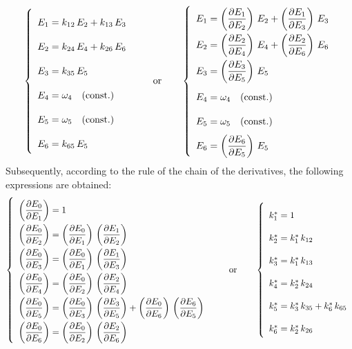 \documentclass[energies,article,submit,moreauthors,pdftex]{Definitions/mdpi}
\newcommand{\dpartial}[2]{\left(\dfrac{\partial E_{#1}}{\partial E_{#2}}\right)}
\begin{document}
\begin{equation}
    \def\arraystretch{2.1}
    \left\{\begin{array}{l}
        E_1=k_{12}\,E_2 + k_{13}\,E_3 \\
        E_2=k_{24}\,E_4 + k_{26}\,E_6 \\
        E_3=k_{35}\,E_5\\
        E_4=\omega_4 \quad \text{(const.)}\\
        E_5=\omega_5 \quad \text{(const.)}\\
        E_6=k_{65}\,E_5
    \end{array}\right.
    \qquad
    \text{or}
    \qquad
    \left\{\begin{array}{l}
        E_1=\dpartial{1}{2}\,E_2 + \dpartial{1}{3}\,E_3 \\
        E_2=\dpartial{2}{4}\,E_4 + \dpartial{2}{6}\,E_6 \\
        E_3=\dpartial{3}{5}\,E_5\\
        E_4=\omega_4 \quad \text{(const.)}\\
        E_5=\omega_5 \quad \text{(const.)}\\
        E_6=\dpartial{6}{5}\,E_5
    \end{array}\right.
    \label{eq:egenplant}
\end{equation}
Subsequently, according to the rule of the chain of the derivatives, the following expressions are obtained:
\begin{equation}
    \def\arraystretch{2.1}
    \left\{\begin{array}{l}
       \dpartial{0}{1}=1 \\
       \dpartial{0}{2}=\dpartial{0}{1}\,\dpartial{1}{2} \\
       \dpartial{0}{3}=\dpartial{0}{1}\,\dpartial{1}{3} \\
       \dpartial{0}{4}=\dpartial{0}{2}\,\dpartial{2}{4} \\
       \dpartial{0}{5}=\dpartial{0}{3}\,\dpartial{3}{5} + \dpartial{0}{6}\,\dpartial{6}{5} \\
       \dpartial{0}{6}=\dpartial{0}{2}\,\dpartial{2}{6} \\
    \end{array}\right.
    \qquad
    \text{or}
    \qquad
       \left\{\begin{array}{l}
        k_1^* = 1 \\
        k_2^* = k_1^*\,k_{12} \\
        k_3^* = k_1^*\,k_{13} \\
        k_4^* = k_2^*\,k_{24} \\
        k_5^* = k_3^*\,k_{35} + k_6^*\,k_{65} \\
        k_6^* = k_2^*\,k_{26} \\
    \end{array}\right.
    \label{eq:kgenplant}
\end{equation}
\end{document}
